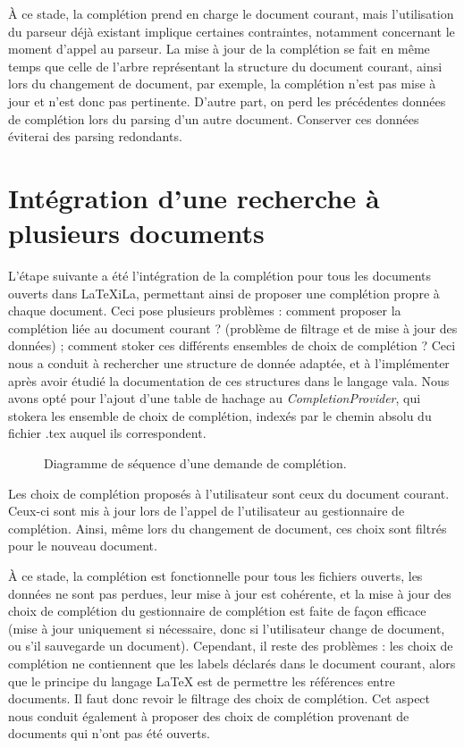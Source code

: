 \documentclass[a4paper,11pt]{report}
\begin{document}
À ce stade, la complétion prend en charge le document courant, mais l'utilisation du parseur déjà existant implique certaines contraintes, notamment concernant le moment d'appel au parseur.
La mise à jour de la complétion se fait en même temps que celle de l'arbre représentant la structure du document courant, ainsi lors du changement de document, par exemple, la complétion n'est pas mise à jour et n'est donc pas pertinente.
D'autre part, on perd les précédentes données de complétion lors du parsing d'un autre document.
Conserver ces données éviterai des parsing redondants.

\section{Intégration d'une recherche à plusieurs documents}
L'étape suivante a été l'intégration de la complétion pour tous les documents ouverts dans LaTeXiLa, permettant ainsi de proposer une complétion propre à chaque document.
Ceci pose plusieurs problèmes : comment proposer la complétion liée au document courant ? (problème de filtrage et de mise à jour des données) ; comment stoker ces différents ensembles de choix de complétion ?
Ceci nous a conduit à rechercher une structure de donnée adaptée, et à l'implémenter après avoir étudié la documentation de ces structures dans le langage vala.
Nous avons opté pour l'ajout d'une table de hachage au \textit{CompletionProvider}, qui stokera les ensemble de choix de complétion, indexés par le chemin absolu du fichier .tex auquel ils correspondent.

\begin{figure}[h]
\label{fig:filtering_completion}
\centering

\caption{Diagramme de séquence d'une demande de complétion.}
\end{figure}

Les choix de complétion proposés à l'utilisateur sont ceux du document courant.
Ceux-ci sont mis à jour lors de l'appel de l'utilisateur au gestionnaire de complétion. Ainsi, même lors du changement de document, ces choix sont filtrés pour le nouveau document.

À ce stade, la complétion est fonctionnelle pour tous les fichiers ouverts, les données ne sont pas perdues, leur mise à jour est cohérente, et la mise à jour des choix de complétion du gestionnaire de complétion est faite de façon efficace (mise à jour uniquement si nécessaire, donc si l'utilisateur change de document, ou s'il sauvegarde un document).
Cependant, il reste des problèmes : les choix de complétion ne contiennent que les labels déclarés dans le document courant, alors que le principe du langage \LaTeX{} est de permettre les références entre documents.
Il faut donc revoir le filtrage des choix de complétion.
Cet aspect nous conduit également à proposer des choix de complétion provenant de documents qui n'ont pas été ouverts.
\end{document}
